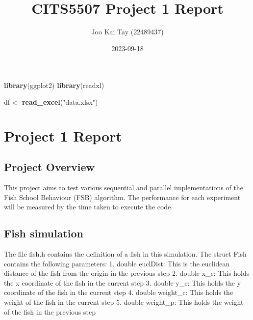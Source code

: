 \documentclass[
]{article}
\title{CITS5507 Project 1 Report}
\author{Joo Kai Tay (22489437)}
\date{2023-09-18}
\newenvironment{Shaded}{\begin{snugshade}}{\end{snugshade}}
\newcommand{\FunctionTok}[1]{\textcolor[rgb]{0.13,0.29,0.53}{\textbf{#1}}}
\newcommand{\NormalTok}[1]{#1}
\newcommand{\OtherTok}[1]{\textcolor[rgb]{0.56,0.35,0.01}{#1}}
\newcommand{\StringTok}[1]{\textcolor[rgb]{0.31,0.60,0.02}{#1}}
\begin{document}
\maketitle

\begin{Shaded}
\begin{Highlighting}[]
\FunctionTok{library}\NormalTok{(ggplot2)}
\FunctionTok{library}\NormalTok{(readxl)}
\end{Highlighting}
\end{Shaded}

\begin{Shaded}
\begin{Highlighting}[]
\NormalTok{df }\OtherTok{\textless{}{-}} \FunctionTok{read\_excel}\NormalTok{(}\StringTok{"data.xlsx"}\NormalTok{)}
\end{Highlighting}
\end{Shaded}

\hypertarget{project-1-report}{%
\section{Project 1 Report}\label{project-1-report}}

\hypertarget{project-overview}{%
\subsection{Project Overview}\label{project-overview}}

This project aims to test various sequential and parallel
implementations of the Fish School Behaviour (FSB) algorithm. The
performance for each experiment will be measured by the time taken to
execute the code.

\hypertarget{fish-simulation}{%
\subsection{Fish simulation}\label{fish-simulation}}

The file fish.h contains the definition of a fish in this simulation.
The struct Fish contains the following parameters: 1. double euclDist:
This is the euclidean distance of the fish from the origin in the
previous step 2. double x\_c: This holds the x coordinate of the fish in
the current step 3. double y\_c: This holds the y coordinate of the fish
in the current step 4. double weight\_c: This holds the weight of the
fish in the current step 5. double weight\_p: This holds the weight of
the fish in the previous step
\end{document}
